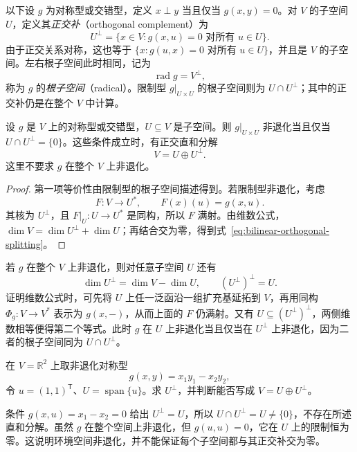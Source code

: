 以下设 $g$ 为对称型或交错型，定义 $x\perp y$ 当且仅当 $g(x,y)=0$。对 $V$ 的子空间 $U$，定义其\emph{正交补}（orthogonal complement）为
\[
    U^\perp=\{x\in V:g(x,u)=0\text{ 对所有 }u\in U\}.
\]
由于正交关系对称，这也等于 $\{x:g(u,x)=0\text{ 对所有 }u\in U\}$，并且是 $V$ 的子空间。左右根子空间此时相同，记为
\[
    \operatorname{rad}g=V^\perp,
\]
称为 $g$ 的\emph{根子空间}（radical）。限制型 $g|_{U\times U}$ 的根子空间则为 $U\cap U^\perp$；其中的正交补仍是在整个 $V$ 中计算。

\begin{theorem}
\label{thm:bilinear-orthogonal-splitting}
设 $g$ 是 $V$ 上的对称型或交错型，$U\subseteq V$ 是子空间。则 $g|_{U\times U}$ 非退化当且仅当 $U\cap U^\perp=\{0\}$。这些条件成立时，有正交直和分解
\begin{equation}
\label{eq:bilinear-orthogonal-splitting}
    V=U\oplus U^\perp.
\end{equation}
这里不要求 $g$ 在整个 $V$ 上非退化。
\end{theorem}

\begin{proof}
第一项等价性由限制型的根子空间描述得到。若限制型非退化，考虑
\[
    F:V\to U^*,\qquad F(x)(u)=g(x,u).
\]
其核为 $U^\perp$，且 $F|_U:U\to U^*$ 是同构，所以 $F$ 满射。由维数公式，$\dim V=\dim U^\perp+\dim U$；再结合交为零，得到式~\eqref{eq:bilinear-orthogonal-splitting}。
\end{proof}

若 $g$ 在整个 $V$ 上非退化，则对任意子空间 $U$ 还有
\begin{equation}
\label{eq:bilinear-perp-dimensions}
    \dim U^\perp=\dim V-\dim U,\qquad (U^\perp)^\perp=U.
\end{equation}
证明维数公式时，可先将 $U$ 上任一泛函沿一组扩充基延拓到 $V$，再用同构 $\Phi_g:V\to V^*$ 表示为 $g(x,-)$，从而上面的 $F$ 仍满射。又有 $U\subseteq(U^\perp)^\perp$，两侧维数相等便得第二个等式。此时 $g$ 在 $U$ 上非退化当且仅当在 $U^\perp$ 上非退化，因为二者的根子空间同为 $U\cap U^\perp$。

\begin{example}
\label{ex:bilinear-isotropic-line}
在 $V=\mathbb R^2$ 上取非退化对称型
\[
    g(x,y)=x_1y_1-x_2y_2,
\]
令 $u=(1,1)^{\mathsf T}$、$U=\operatorname{span}\{u\}$。求 $U^\perp$，并判断能否写成 $V=U\oplus U^\perp$。
\end{example}

\begin{solve}
条件 $g(x,u)=x_1-x_2=0$ 给出 $U^\perp=U$，所以 $U\cap U^\perp=U\neq\{0\}$，不存在所述直和分解。虽然 $g$ 在整个空间上非退化，但 $g(u,u)=0$，它在 $U$ 上的限制恒为零。这说明环境空间非退化，并不能保证每个子空间都与其正交补交为零。
\end{solve}

